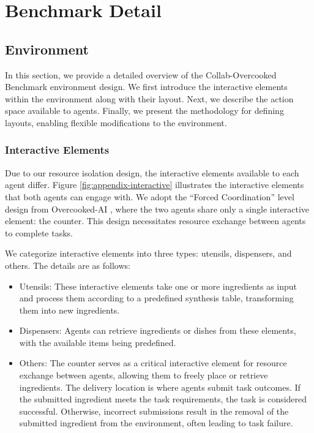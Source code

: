 \documentclass[11pt]{article}
\begin{document}
\newpage
%


\newpage

\appendix









\section{Benchmark Detail}
\label{ap-benchmark-detail}

\subsection{Environment}
\label{ap-environment}


In this section, we provide a detailed overview of the Collab-Overcooked Benchmark environment design. We first introduce the interactive elements within the environment along with their layout. Next, we describe the action space available to agents. Finally, we present the methodology for defining layouts, enabling flexible modifications to the environment.

\subsubsection{Interactive Elements}

Due to our resource isolation design, the interactive elements available to each agent differ. Figure \ref{fig:appendix-interactive} illustrates the interactive elements that both agents can engage with. We adopt the ``Forced Coordination'' level design from Overcooked-AI \cite{carroll2019utility}, where the two agents share only a single interactive element: the counter. This design necessitates resource exchange between agents to complete tasks.

We categorize interactive elements into three types: utensils, dispensers, and others. The details are as follows:
\begin{itemize} 
\item[$\bullet$] Utensils: These interactive elements take one or more ingredients as input and process them according to a predefined synthesis table, transforming them into new ingredients.  

\item[$\bullet$] Dispensers: Agents can retrieve ingredients or dishes from these elements, with the available items being predefined.  

\item[$\bullet$] Others: The counter serves as a critical interactive element for resource exchange between agents, allowing them to freely place or retrieve ingredients. The delivery location is where agents submit task outcomes. If the submitted ingredient meets the task requirements, the task is considered successful. Otherwise, incorrect submissions result in the removal of the submitted ingredient from the environment, often leading to task failure.  
\end{itemize}
\end{document}
